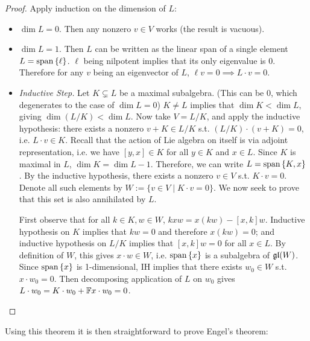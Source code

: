 \documentclass{article}
\begin{document}
\begin{proof}
    Apply induction on the dimension of $L$:
    \begin{itemize}
        \item $\dim L = 0$. Then any nonzero $v \in V$ works (the result is vacuous).
        \item $\dim L = 1$. Then $L$ can be written as the linear span of a single element $L = \operatorname{span}\left\{ \ell \right\}$. $\ell$ being nilpotent implies that its only eigenvalue is 0. Therefore for any $v$ being an eigenvector of $L$, $\ell v = 0 \implies L \cdot v = 0$.
        \item \emph{Inductive Step.} Let $K \subsetneq L$ be a maximal subalgebra. (This can be 0, which degenerates to the case of $\dim L = 0$) $K \neq L$ implies that $\dim K < \dim L$, giving $\dim (L/K) < \dim L$. Now take $V = L/K$, and apply the inductive hypothesis: there exists a nonzero $v + K \in L/K$ s.t. $(L/K) \cdot (v + K) = 0$, i.e. $L\cdot v \in K$. Recall that the action of Lie algebra on itself is via adjoint representation, i.e. we have $[y, x] \in K$ for all $y \in K$ and $x \in L$. Since $K$ is maximal in $L$, $\dim K = \dim L - 1$. Therefore, we can write $L = \operatorname{span}\left\{ K, x \right\}$. By the inductive hypothesis, there exists a nonzero $v \in V$ s.t. $K \cdot v = 0$. Denote all such elements by $W := \{ v \in V \mid K\cdot v = 0 \}$. We now seek to prove that this set is also annihilated by $L$. 
        
        First observe that for all $k \in K, w \in W$, $kxw = x(kw) - [x, k]w$. Inductive hypothesis on $K$ implies that $kw = 0$ and therefore $x(kw) = 0$; and inductive hypothesis on $L/K$ implies that $[x, k]w = 0$ for all $x \in L$. By definition of $W$, this gives $x \cdot w \in W$, i.e. $\operatorname{span}\left\{ x \right\}$ is a subalgebra of $\mathfrak{gl}(W)$. Since $\operatorname{span}\left\{ x \right\}$ is 1-dimensional, IH implies that there exists $w_0 \in W$ s.t. $x \cdot w_0 = 0$. Then decomposing application of $L$ on $w_0$ gives $L \cdot w_0 = K \cdot w_0 + \mathbb{F} x \cdot w_0 = 0$.
    \end{itemize}
\end{proof}

\textstart
Using this theorem it is then straightforward to prove Engel's theorem:
\end{document}
